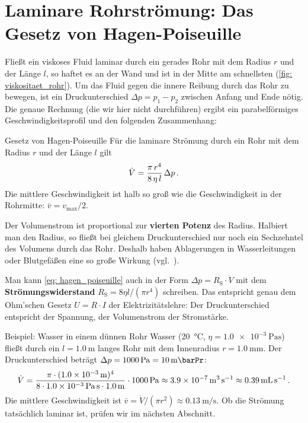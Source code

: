 \section{Laminare Rohrströmung: Das Gesetz von Hagen-Poiseuille}\label{sec: hagen_poiseuille}
Fließt ein viskoses Fluid laminar durch ein gerades Rohr mit dem Radius $r$ und der Länge $l$, so haftet es an der Wand und ist in der Mitte am schnellsten (\cref{fig: viskositaet_rohr}). Um das Fluid gegen die innere Reibung durch das Rohr zu bewegen, ist ein Druckunterschied $\Delta p = p_1 - p_2$ zwischen Anfang und Ende nötig. Die genaue Rechnung (die wir hier nicht durchführen) ergibt ein parabelförmiges Geschwindigkeitsprofil und den folgenden Zusammenhang:
\begin{importantbox}[]{Gesetz von Hagen-Poiseuille}
    Für die laminare Strömung durch ein Rohr mit dem Radius $r$ und der Länge $l$ gilt
    \begin{equation}\label{eq: hagen_poiseuille}
        \dot{V} = \frac{\pi \, r^4}{8 \, \eta \, l} \, \Delta p \,.
    \end{equation}
    Die mittlere Geschwindigkeit ist halb so groß wie die Geschwindigkeit in der Rohrmitte: $\bar{v} = v_\text{max}/2$.
\end{importantbox}

Der Volumenstrom ist proportional zur \textbf{vierten Potenz} des Radius. Halbiert man den Radius, so fließt bei gleichem Druckunterschied nur noch ein Sechzehntel des Volumens durch das Rohr. Deshalb haben Ablagerungen in Wasserleitungen oder Blutgefäßen eine so große Wirkung (vgl.~\cite[S.~397]{Tipler2015}).

Man kann \cref{eq: hagen_poiseuille} auch in der Form $\Delta p = R_\text{S} \cdot \dot{V}$ mit dem \textbf{Strömungswiderstand} $R_\text{S} = 8\eta l/(\pi r^4)$ schreiben. Das entspricht genau dem Ohm'schen Gesetz $U = R \cdot I$ der Elektrizitätslehre: Der Druckunterschied entspricht der Spannung, der Volumenstrom der Stromstärke.

\begin{examplebox}[]{Beispiel: Wasser in einem dünnen Rohr}
    Wasser (\SI{20}{\celsius}, $\eta = \SI{1.0e-3}{\pascal\second}$) fließt durch ein $l = \SI{1.0}{\meter}$ langes Rohr mit dem Innenradius $r = \SI{1.0}{\milli\meter}$. Der Druckunterschied beträgt $\Delta p = \SI{1000}{\pascal} = \SI{10}{\milli\barPr}$:
    \begin{equation*}
        \dot{V} = \frac{\pi \cdot (\SI{1.0e-3}{\meter})^4}{8 \cdot \SI{1.0e-3}{\pascal\second} \cdot \SI{1.0}{\meter}} \cdot \SI{1000}{\pascal} \approx \SI{3.9e-7}{\meter\cubed\per\second} \approx \SI{0.39}{\milli\liter\per\second} \,.
    \end{equation*}
    Die mittlere Geschwindigkeit ist $\bar{v} = \dot{V}/(\pi r^2) \approx \SI{0.13}{\meter\per\second}$. Ob die Strömung tatsächlich laminar ist, prüfen wir im nächsten Abschnitt.
\end{examplebox}

